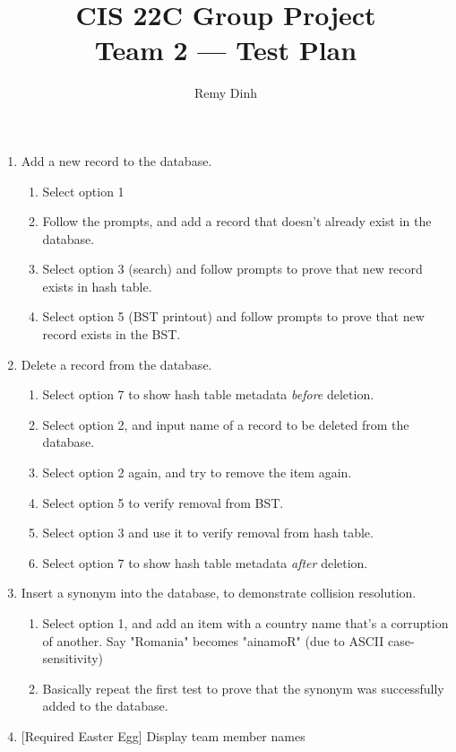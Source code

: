 \documentclass{article}
\title{CIS 22C Group Project\\Team 2 --- Test Plan}
\author{Remy Dinh}
\begin{document}
\maketitle{}
\begin{enumerate}
    \item{Add a new record to the database.}
        \begin{enumerate}
            \item{Select option 1}
            \item{Follow the prompts, and add a record that doesn't already exist in the database.}
            \item{Select option 3 (search) and follow prompts to prove that new record exists in hash table.}
            \item{Select option 5 (BST printout) and follow prompts to prove that new record exists in the BST.}
        \end{enumerate}
    \item{Delete a record from the database.}
        \begin{enumerate}
            \item{Select option 7 to show hash table metadata \textit{before} deletion.}
            \item{Select option 2, and input name of a record to be deleted from the database.}
            \item{Select option 2 again, and try to remove the item again.}
            \item{Select option 5 to verify removal from BST.}
            \item{Select option 3 and use it to verify removal from hash table.}
            \item{Select option 7 to show hash table metadata \textit{after} deletion.}
        \end{enumerate}
    \item{Insert a synonym into the database, to demonstrate collision resolution.}
        \begin{enumerate}
            \item{Select option 1, and add an item with a country name that's a corruption of another. Say "Romania" becomes "ainamoR" (due to ASCII case-sensitivity)}
            \item{Basically repeat the first test to prove that the synonym was successfully added to the database.}
        \end{enumerate}
    \item{[Required Easter Egg] Display team member names}

\end{enumerate}
\end{document}
